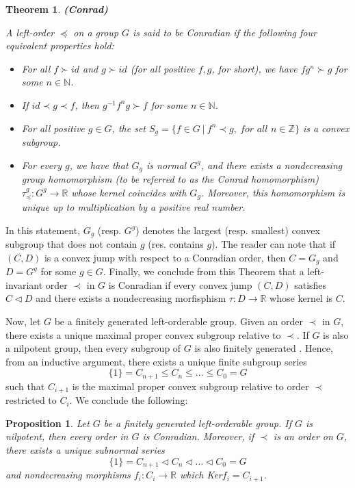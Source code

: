 \documentclass[12pt]{article}
\newtheorem{thm}{Theorem}
\newtheorem{prop}{Proposition}
\theoremstyle{definition}
\begin{document}
\begin{thm}\textbf{(Conrad)} {\it A left-order $\preceq$ on a group $G$ is said to be Conradian if the following four equivalent properties hold:
\begin{itemize}
    \item[(1)] For all $f\succ id $ and $g\succ id$ (for all positive $f,g$, for short), we have $fg^n\succ g$ for some $n\in \mathbb{N}$.
    \item[(2)] If $id\prec g\prec f$, then $g^{-1}f^ng\succ f$ for some $n\in \mathbb{N}$.
    \item[(3)] For all positive $g\in G$, the set $S_g=\{f\in G\ |\ f^n\prec g,\ \textit{for all } n\in\mathbb{Z}\}$ is a convex subgroup.
    \item[(4)] For every $g$, we have that $G_g$ is normal $G^g$, and there exists a nondecreasing group homomorphism (to be referred to as the Conrad homomorphism) $\tau_{\preceq}^g:G^g\rightarrow \mathbb{R}$ whose kernel coincides with $G_g$. Moreover, this homomorphism is unique up to multiplication by a positive real number.
\end{itemize}
}
\end{thm} 
In this statement, $G_g$ (resp. $G^g$) denotes the largest (resp. smallest) convex subgroup that does not contain $g$ (res. contains $g$).
The reader can note that if $(C,D)$ is a convex jump with respect to a Conradian order, then $C=G_g$ and $D=G^g$ for some $g\in G$.
Finally, we conclude from this Theorem that a left-invariant order $\prec$ in $G$ is Conradian if every convex jump $(C,D)$ satisfies $C\vartriangleleft D$ and there exists a nondecreasing morfisphism $\tau:D\rightarrow \mathbb{R}$ whose kernel is $C$. 

Now, let $G$ be a finitely generated left-orderable group. Given an order $\prec$ in $G$, there exists a unique maximal proper convex subgroup relative to $\prec$. If $G$ is also a nilpotent group, then every subgroup of $G$ is also finitely generated \cite[Chapter 5]{Robinson}. Hence, from an inductive argument, there exists a unique finite subgroup series
$$\{1\}=C_{n+1}\leq C_{n} \leq \dots\leq  C_0=G$$
such that $C_{i+1}$ is the maximal proper convex subgroup relative to order $\prec$ restricted to $C_i$. 
We conclude the following:

\begin{prop}
\label{series}
Let $G$ be a finitely generated left-orderable group. If $G$ is nilpotent, then every order in $G$ is Conradian. Moreover, if $\prec$ is an order on $G$, there exists a unique subnormal series
$$\{1\}=C_{n+1}\vartriangleleft C_{n} \vartriangleleft \dots \vartriangleleft  C_0=G$$
and nondecreasing morphisms $f_i:C_i\rightarrow \mathbb{R}$ which Ker$f_i=C_{i+1}$.
\end{prop}
\end{document}
